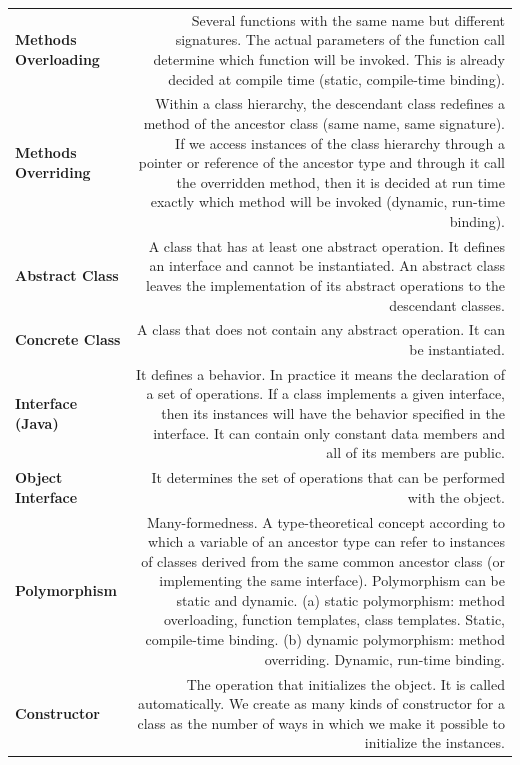 \documentclass[margin=0px]{article}
\begin{document}
\begin{longtable}{L R}
\textbf{Methods Overloading} &
Several functions with the same name but different signatures. The actual parameters of the function call determine which function will be invoked. This is already decided at compile time (static, compile-time binding). \\[4pt]

\textbf{Methods Overriding} &
Within a class hierarchy, the descendant class redefines a method of the ancestor class (same name, same signature). If we access instances of the class hierarchy through a pointer or reference of the ancestor type and through it call the overridden method, then it is decided at run time exactly which method will be invoked (dynamic, run-time binding). \\[4pt]

\textbf{Abstract Class} &
A class that has at least one abstract operation. It defines an interface and cannot be instantiated. An abstract class leaves the implementation of its abstract operations to the descendant classes. \\[4pt]

\textbf{Concrete Class} &
A class that does not contain any abstract operation. It can be instantiated. \\[4pt]

\textbf{Interface (Java)} &
It defines a behavior. In practice it means the declaration of a set of operations. If a class implements a given interface, then its instances will have the behavior specified in the interface. It can contain only constant data members and all of its members are public. \\[4pt]

\textbf{Object Interface} &
It determines the set of operations that can be performed with the object. \\[4pt]

\textbf{Polymorphism} &
Many-formedness. A type-theoretical concept according to which a variable of an ancestor type can refer to instances of classes derived from the same common ancestor class (or implementing the same interface). Polymorphism can be static and dynamic.
(a) static polymorphism: method overloading, function templates, class templates. Static, compile-time binding.
(b) dynamic polymorphism: method overriding. Dynamic, run-time binding. \\[4pt]

\textbf{Constructor} &
The operation that initializes the object. It is called automatically. We create as many kinds of constructor for a class as the number of ways in which we make it possible to initialize the instances. \\[4pt]


\end{longtable}
\end{document}
